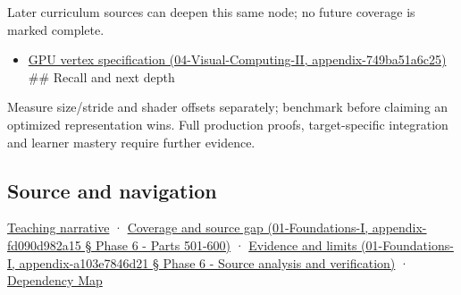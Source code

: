 Later curriculum sources can deepen this same node; no future coverage is marked complete.

\begin{itemize}
\tightlist
\item
  \href{}{GPU vertex specification (04-Visual-Computing-II, appendix-749ba51a6c25)} \#\# Recall and next depth
\end{itemize}

Measure size/stride and shader offsets separately; benchmark before claiming an optimized representation wins. Full production proofs, target-specific integration and learner mastery require further evidence.

\subsection{Source and navigation}\label{source-and-navigation}

\href{Continuous\%20Notes/Computing\%20Foundations\%20-\%20From\%20Bits\%20to\%20C++\%20and\%20Systems\%20APIs\#Storage\%20and\%20computation\%20can\%20choose\%20different\%20layouts}{Teaching narrative} · \href{}{Coverage and source gap (01-Foundations-I, appendix-fd090d982a15 § Phase 6 - Parts 501-600)} · \href{}{Evidence and limits (01-Foundations-I, appendix-a103e7846d21 § Phase 6 - Source analysis and verification)} · \hyperref[appendix-4ad47bdd269a]{Dependency Map}
